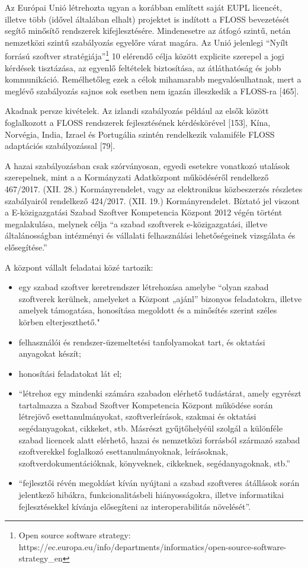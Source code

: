 \documentclass[12pt,magyar,a4paper,oneside]{scrreprt}
\providecommand{\tightlist}{%
  \setlength{\itemsep}{0pt}\setlength{\parskip}{0pt}}
\begin{document}
Az Európai Unió létrehozta ugyan a korábban említett saját EUPL
licencét, illetve több (idővel általában elhalt) projektet is indított a
FLOSS bevezetését segítő minősítő rendszerek kifejlesztésére.
Mindenesetre az átfogó szintű, netán nemzetközi szintű szabályozás
egyelőre várat magára. Az Unió jelenlegi ``Nyílt forrású szoftver
stratégiája''\footnote{Open source software strategy:
  https://ec.europa.eu/info/departments/informatics/open-source-software-strategy\_en}
10 elérendő célja között explicite szerepel a jogi kérdések tisztázása,
az egyenlő feltételek biztosítása, az átláthatóság és jobb kommunikáció.
Remélhetőleg ezek a célok mihamarabb megvalósulhatnak, mert a meglévő
szabályozás sajnos sok esetben nem igazán illeszkedik a FLOSS-ra
{[}465{]}.

Akadnak persze kivételek. Az izlandi szabályozás például az elsők között
foglalkozott a FLOSS rendszerek fejlesztésének kérdéskörével {[}153{]},
Kína, Norvégia, India, Izrael és Portugália szintén rendelkezik
valamiféle FLOSS adaptációs szabályozással {[}79{]}.

A hazai szabályozásban csak szórványosan, egyedi esetekre vonatkozó
utalások szerepelnek, mint a a Kormányzati Adatközpont működéséről
rendelkező 467/2017. (XII. 28.) Kormányrendelet, vagy az elektronikus
közbeszerzés részletes szabályairól rendelkező 424/2017. (XII. 19.)
Kormányrendelet. Bíztató jel viszont a E-közigazgatási Szabad Szoftver
Kompetencia Központ 2012 végén történt megalakulása, melynek célja ``a
szabad szoftverek e-közigazgatási, illetve általánosságban intézményi és
vállalati felhasználási lehetőségeinek vizsgálata és elősegítése.''

A központ vállalt feladatai közé tartozik:

\begin{itemize}
\tightlist
\item
  egy szabad szoftver keretrendszer létrehozása amelybe ``olyan szabad
  szoftverek kerülnek, amelyeket a Központ „ajánl'' bizonyos
  feladatokra, illetve amelyek támogatása, honosítása megoldott és a
  minősítés szerint széles körben elterjeszthető."
\item
  felhasználói és rendszer-üzemeltetési tanfolyamokat tart, és oktatási
  anyagokat készít;
\item
  honosítási feladatokat lát el;
\item
  ``létrehoz egy mindenki számára szabadon elérhető tudástárat, amely
  egyrészt tartalmazza a Szabad Szoftver Kompetencia Központ működése
  során létrejövő esettanulmányokat, szoftverleírások, szakmai és
  oktatási segédanyagokat, cikkeket, stb. Másrészt gyűjtőhelyéül szolgál
  a különféle szabad licencek alatt elérhető, hazai és nemzetközi
  forrásból származó szabad szoftverekkel foglalkozó esettanulmányoknak,
  leírásoknak, szoftverdokumentációknak, könyveknek, cikkeknek,
  segédanyagoknak, stb.''
\item
  ``fejlesztői révén megoldást kíván nyújtani a szabad szoftveres
  átállások során jelentkező hibákra, funkcionalitásbeli hiányosságokra,
  illetve informatikai fejlesztésekkel kívánja elősegíteni az
  interoperabilitás növelését''.
\end{itemize}
\end{document}
